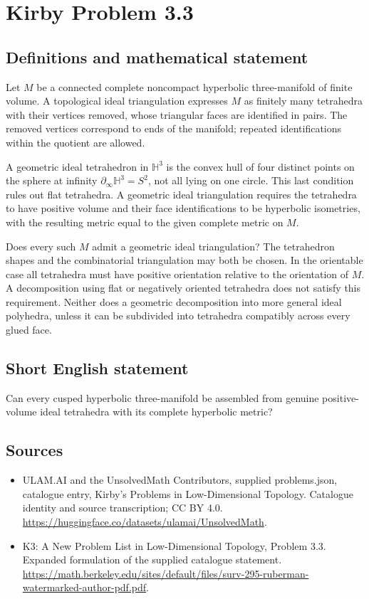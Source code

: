 \documentclass[11pt,a4paper]{article}
\begin{document}
\section*{Kirby Problem 3.3}\label{statement}

\subsection{Definitions and mathematical statement}
Let $M$ be a connected complete noncompact hyperbolic three-manifold of finite
volume. A topological ideal triangulation expresses $M$ as finitely many
tetrahedra with their vertices removed, whose triangular faces are identified
in pairs. The removed vertices correspond to ends of the manifold; repeated
identifications within the quotient are allowed.

A geometric ideal tetrahedron in $\mathbb H^3$ is the convex hull of four
distinct points on the sphere at infinity $\partial_\infty\mathbb H^3=S^2$,
not all lying on one circle. This last condition rules out flat tetrahedra.
A geometric ideal triangulation requires the tetrahedra to have positive
volume and their face identifications to be hyperbolic isometries, with the
resulting metric equal to the given complete metric on $M$.

Does every such $M$ admit a geometric ideal triangulation? The tetrahedron
shapes and the combinatorial triangulation may both be chosen. In the
orientable case all tetrahedra must have positive orientation relative to the
orientation of $M$. A decomposition using flat or negatively oriented
tetrahedra does not satisfy this requirement. Neither does a geometric
decomposition into more general ideal polyhedra, unless it can be subdivided
into tetrahedra compatibly across every glued face.
\subsection{Short English statement}
Can every cusped hyperbolic three-manifold be assembled from genuine positive-volume ideal tetrahedra with its complete hyperbolic metric?
\subsection{Sources}
\begin{itemize}
\item[S1] ULAM.AI and the UnsolvedMath Contributors, supplied problems.json, catalogue entry, Kirby's Problems in Low-Dimensional Topology. Catalogue identity and source transcription; CC BY 4.0.
\url{https://huggingface.co/datasets/ulamai/UnsolvedMath}.
\item[S2] K3: A New Problem List in Low-Dimensional Topology, Problem 3.3. Expanded formulation of the supplied catalogue statement.
\url{https://math.berkeley.edu/sites/default/files/surv-295-ruberman-watermarked-author-pdf.pdf}.
\end{itemize}
\end{document}
